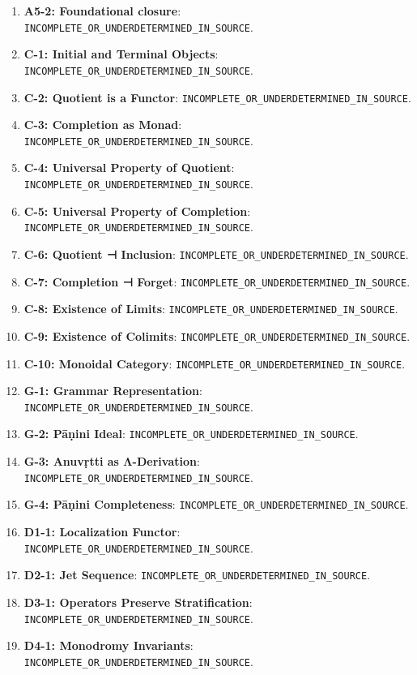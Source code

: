 \documentclass[12pt, oneside]{article}
\begin{document}
\begin{enumerate}
\item \textbf{A5-2: Foundational closure}: \texttt{INCOMPLETE\_OR\_UNDERDETERMINED\_IN\_SOURCE}.
\item \textbf{C-1: Initial and Terminal Objects}: \texttt{INCOMPLETE\_OR\_UNDERDETERMINED\_IN\_SOURCE}.
\item \textbf{C-2: Quotient is a Functor}: \texttt{INCOMPLETE\_OR\_UNDERDETERMINED\_IN\_SOURCE}.
\item \textbf{C-3: Completion as Monad}: \texttt{INCOMPLETE\_OR\_UNDERDETERMINED\_IN\_SOURCE}.
\item \textbf{C-4: Universal Property of Quotient}: \texttt{INCOMPLETE\_OR\_UNDERDETERMINED\_IN\_SOURCE}.
\item \textbf{C-5: Universal Property of Completion}: \texttt{INCOMPLETE\_OR\_UNDERDETERMINED\_IN\_SOURCE}.
\item \textbf{C-6: Quotient ⊣ Inclusion}: \texttt{INCOMPLETE\_OR\_UNDERDETERMINED\_IN\_SOURCE}.
\item \textbf{C-7: Completion ⊣ Forget}: \texttt{INCOMPLETE\_OR\_UNDERDETERMINED\_IN\_SOURCE}.
\item \textbf{C-8: Existence of Limits}: \texttt{INCOMPLETE\_OR\_UNDERDETERMINED\_IN\_SOURCE}.
\item \textbf{C-9: Existence of Colimits}: \texttt{INCOMPLETE\_OR\_UNDERDETERMINED\_IN\_SOURCE}.
\item \textbf{C-10: Monoidal Category}: \texttt{INCOMPLETE\_OR\_UNDERDETERMINED\_IN\_SOURCE}.
\item \textbf{G-1: Grammar Representation}: \texttt{INCOMPLETE\_OR\_UNDERDETERMINED\_IN\_SOURCE}.
\item \textbf{G-2: Pāṇini Ideal}: \texttt{INCOMPLETE\_OR\_UNDERDETERMINED\_IN\_SOURCE}.
\item \textbf{G-3: Anuvṛtti as Λ-Derivation}: \texttt{INCOMPLETE\_OR\_UNDERDETERMINED\_IN\_SOURCE}.
\item \textbf{G-4: Pāṇini Completeness}: \texttt{INCOMPLETE\_OR\_UNDERDETERMINED\_IN\_SOURCE}.
\item \textbf{D1-1: Localization Functor}: \texttt{INCOMPLETE\_OR\_UNDERDETERMINED\_IN\_SOURCE}.
\item \textbf{D2-1: Jet Sequence}: \texttt{INCOMPLETE\_OR\_UNDERDETERMINED\_IN\_SOURCE}.
\item \textbf{D3-1: Operators Preserve Stratification}: \texttt{INCOMPLETE\_OR\_UNDERDETERMINED\_IN\_SOURCE}.
\item \textbf{D4-1: Monodromy Invariants}: \texttt{INCOMPLETE\_OR\_UNDERDETERMINED\_IN\_SOURCE}.

\end{enumerate}
\end{document}
